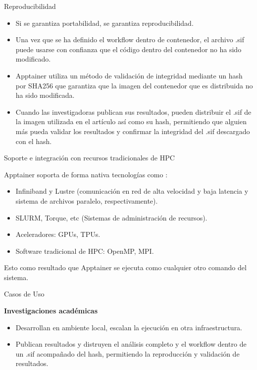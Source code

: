 \documentclass[11pt]{beamer}
\begin{document}
\begin{frame}{Reproducibilidad}
  \begin{itemize}
  	\item Si se garantiza portabilidad, se garantiza reproducibilidad.
 
  	\item Una vez que se ha definido el workflow dentro de contenedor, el archivo .sif puede usarse con confianza que el código dentro del contenedor no ha sido modificado.
  	\item Apptainer utiliza un método de validación de integridad mediante un hash por SHA256 que garantiza que la imagen del contenedor que es distribuida no ha sido modificada. 
  	\item Cuando las investigadoras publican sus resultados, pueden distribuir el .sif de la imagen utilizada en el artículo así como su hash, permitiendo que alguien más pueda validar los resultados y confirmar la integridad del .sif descargado con el hash. 
  \end{itemize}
\end{frame}

\begin{frame}{Soporte e integración con recursos tradicionales de HPC}

Apptainer soporta de forma nativa tecnologías como :
	\begin{itemize}
		\item Infiniband y Lustre (comunicación en red de alta velocidad y baja latencia y sistema de archivos paralelo, respectivamente).
		\item SLURM, Torque, etc (Sistemas de administración de recursos).
		\item Aceleradores: GPUs, TPUs.
		\item Software tradicional de HPC: OpenMP, MPI. 
	\end{itemize}

Esto como resultado que Apptainer se ejecuta como cualquier otro comando del sistema. 
\end{frame}


\begin{frame}{Casos de Uso}

\textbf{Investigaciones académicas}

\begin{itemize}
	\item Desarrollan en ambiente local, escalan la ejecución en otra infraestructura.
	\item Publican resultados y distruyen el análisis completo y el workflow dentro de un .sif acompañado del hash, permitiendo la reproducción y validación de resultados. 
\end{itemize}
\end{frame}
\end{document}
